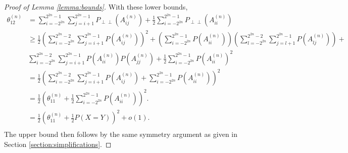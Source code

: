 \documentclass[12pt]{article}
\DeclareMathOperator{\AUC}{AUC}
\renewcommand{\P}{P}
\newcommand{\cind}{\perp \!\!\! \perp}
\newcommand{\aucindiv}{\theta_{11}}%
\newcommand{\aucpop}{\theta_{12}}%
\newcommand{\Pind}{P_{\cind}}
\newcommand{\A}[1]{P(A^{(n)}_{#1})}
\begin{document}
\begin{proof}[Proof of Lemma \ref{lemma:bounds}]


    With these lower bounds,
    \begin{align}
    \aucpop^{(n)} &= \sum_{i=-2^{2n}}^{2^{2n}-1}\sum_{j=i+1}^{2^{2n}-1} \Pind(A_{ij}^{(n)})
                    + \frac{1}{2}\sum_{i=-2^{2n}}^{2^{2n}-1} \Pind(A_{ii}^{(n)})\\
                  &\ge \frac{1}{2}\left(\sum_{i=-2^{2n}}^{2^{2n}-2}\sum_{j=i+1}^{2^{2n}-1}\A{ij}\right)^2 +
                    \left(\sum_{i=-2^{2n}}^{2^{2n}-1}\A{ii}\right)
                    \left(\sum_{l=-2^{2n}}^{2^{2n}-2}\sum_{j=l+1}^{2^{2n}-1}\A{lj}\right) +\\
                  &\sum_{i=-2^{2n}}^{2^{2n}-2}\sum_{j=i+1}^{2^{2n}-1} \A{ii}\A{jj}
                    + \frac{1}{2}\sum_{i=-2^{2n}}^{2^{2n}-1} \P(A_{ii}^{(n)})^2\\
                  &= \frac{1}{2}\left(\sum_{i=-2^{2n}}^{2^{2n}-2}\sum_{j=i+1}^{2^{2n}-1}\A{ij} +
                    \sum_{i=-2^{2n}}^{2^{2n}-1} \P(A_{ii}^{(n)})\right)^2\\
      &= \frac{1}{2}\left(\aucindiv^{(n)} +\frac{1}{2}\sum_{i=-2^{2n}}^{2^{2n}-1} \P(A_{ii}^{(n)})\right)^2.\\
      &= \frac{1}{2}\left(\aucindiv^{(n)} +\frac{1}{2}\P(X=Y)\right)^2+o(1).\\
    \end{align}
     The upper bound then follows by the same symmetry argument as given in Section \ref{section:simplifications}.

  \end{proof}
\end{document}
